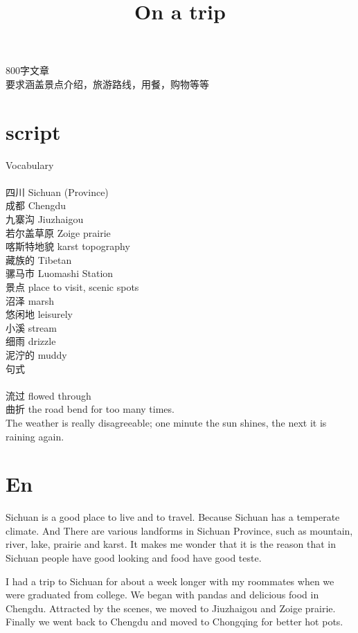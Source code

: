 \documentclass[UTF8]{article}
\title{On a trip}
\begin{document}
\maketitle

800字文章 \\
要求涵盖景点介绍，旅游路线，用餐，购物等等

\section{script}

Vocabulary \\ 
\\
四川	Sichuan (Province) \\
成都	Chengdu \\
九寨沟  Jiuzhaigou \\
若尔盖草原 Zoige prairie \\
喀斯特地貌 karst topography \\
藏族的 Tibetan \\
骡马市 Luomashi Station \\
景点 place to visit, scenic spots\\
沼泽 marsh\\
悠闲地 leisurely\\
小溪 stream \\
细雨 drizzle\\
泥泞的 muddy\\

句式\\
\\
流过 flowed through\\
曲折 the road bend for too many times.\\
The weather is really disagreeable; one minute the sun shines, the next it is raining again.\\

\section{En}

Sichuan is a good place to live and to travel. Because Sichuan has a temperate climate.
And There are various landforms in Sichuan Province, such as mountain,  river, lake, prairie and karst.
It makes me wonder that it is the reason that in Sichuan people have good looking and food have good teste.

I had a trip to Sichuan for about a week longer with my roommates when we were graduated from college.
We began with pandas and delicious food in Chengdu. Attracted by the scenes, we moved to  Jiuzhaigou and Zoige prairie. Finally we went back to Chengdu and moved to Chongqing for better hot pots.
\end{document}
